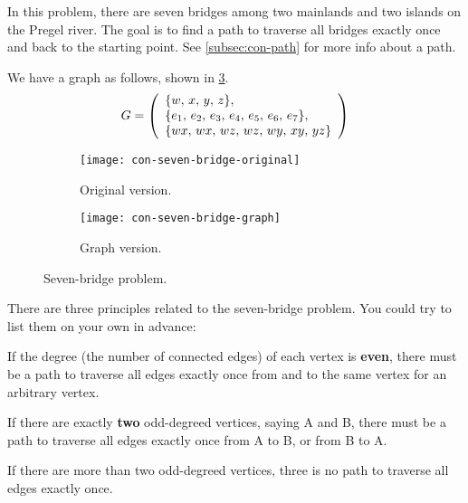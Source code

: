 \documentclass[../src/handouts/main.tex]{subfiles}
\begin{document}
In this problem, there are seven bridges among two mainlands and two islands on the Pregel river. The goal is to find a path to traverse all bridges exactly once and back to the starting point. See \cref{subsec:con-path} for more info about a path.

We have a graph as follows, shown in \cref{fig:con-seven-bridge}.
\begin{equation*}
  G =
  \left(
  \begin{array}{l}
    \{ w,\, x,\, y,\, z \},                        \\
    \{ \foreach \i in {1,...,6} {e_\i,\, } e_7 \}, \\
    \{ wx,\, wx,\, wz,\, wz,\, wy,\, xy,\, yz \}
  \end{array}
  \right)
\end{equation*}

\begin{figure}[ht]
  \centering
  \begin{subfigure}{0.35\textwidth}
    \centering
    \texttt{[image: con-seven-bridge-original]}
    \caption{Original version.}
    \label{fig:con-seven-bridge-original}
  \end{subfigure}
  \hspace{.1\textwidth}
  \begin{subfigure}{0.25\textwidth}
    \centering
    \texttt{[image: con-seven-bridge-graph]}
    \caption{Graph version.}
    \label{fig:con-seven-bridge-graph}
  \end{subfigure}
  \caption{Seven-bridge problem.}
  \label{fig:con-seven-bridge}
\end{figure}

There are three principles related to the seven-bridge problem. You could try to list them on your own in advance:
\begin{enumerate*}
  \item If the degree (the number of connected edges) of each vertex is \textbf{even}, there must be a path to traverse all edges exactly once from and to the same vertex for an arbitrary vertex.
  \item If there are exactly \textbf{two} odd-degreed vertices, saying A and B, there must be a path to traverse all edges exactly once from A to B, or from B to A.
  \item If there are more than two odd-degreed vertices, three is no path to traverse all edges exactly once.
\end{enumerate*}
\end{document}
